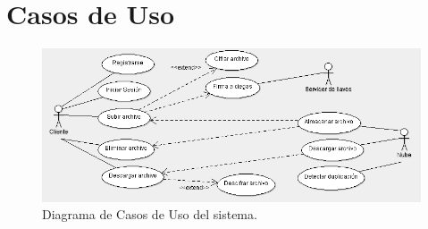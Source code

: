 \newpage

\section{Casos de Uso}

\begin{figure}[htbp!]
		\centering
			\includegraphics[width=1\textwidth]{images/CasosDeUso}
		\caption{Diagrama de Casos de Uso del sistema.}
	\end{figure}